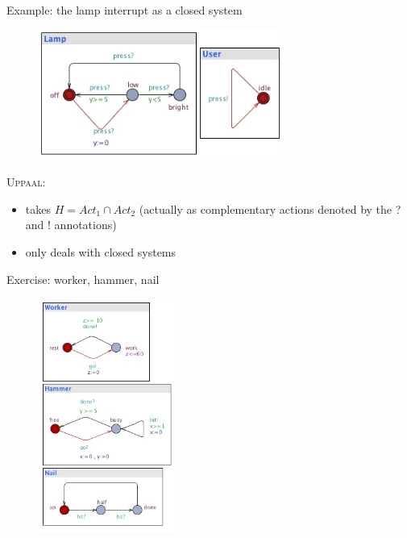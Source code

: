 \documentclass{beamer}
\def\dkb#1{{\blue #1}}
\def\uppaal{\textsc{Uppaal}}
\begin{document}
\begin{slide}{Example: the lamp interrupt as a closed system}
\small

\begin{figure}[htb]
  \centering
  \includegraphics[width=8cm]{./images/lamp2.jpg}\\
\end{figure}


\begin{block}{\uppaal:}
\begin{itemize}
\item takes $H = Act_1 \cap Act_2$ (actually as \dkb{complementary} actions denoted by the \dkb{?} and \dkb{!} 
annotations)
\item  only deals with \dkb{closed} systems 
\end{itemize}
\end{block}
\end{slide}

\begin{slide}{Exercise: worker, hammer, nail}
\small

\begin{figure}[htb]
  \centering
  \includegraphics[width=45mm]{./images/WHN.jpg}\\
\end{figure}
\end{slide}
\end{document}

